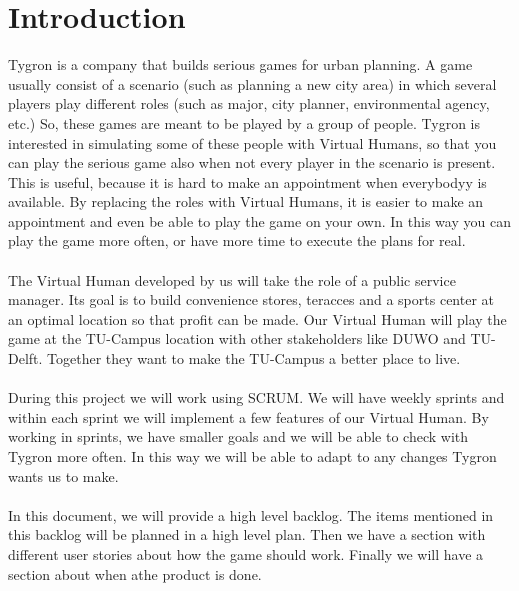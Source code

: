 \section{Introduction}

Tygron is a company that builds serious games for urban planning.
A game usually consist of a scenario (such as planning a new city area) in which several players play different roles (such as major, city planner, environmental agency, etc.)
So, these games are meant to be played by a group of people.
Tygron is interested in simulating some of these people with Virtual Humans, so that you can play the serious game also when not every player in the scenario is present. This is useful, because it is hard to make an appointment when everybodyy is available. By replacing the roles with Virtual Humans, it is easier to make an appointment and even be able to play the game on your own. In this way you can play the game more often, or have more time to execute the plans for real.
\\
\\
The Virtual Human developed by us will take the role of a public service manager. Its goal is to build convenience stores, teracces and a sports center at an optimal location so that profit can be made. Our Virtual Human will play the game at the TU-Campus location with other stakeholders like DUWO and TU-Delft. Together they want to make the TU-Campus a better place to live.
\\
\\
During this project we will work using SCRUM. We will have weekly sprints and within each sprint we will implement a few features of our Virtual Human. By working in sprints, we have smaller goals and we will be able to check with Tygron more often. In this way we will be able to adapt to any changes Tygron wants us to make.
\\
\\
In this document, we will provide a high level backlog. The items mentioned in this backlog will be planned in a high level plan. Then we have a section with different user stories about how the game should work. Finally we will have a section about when athe product is done.
\\
\\


\newpage